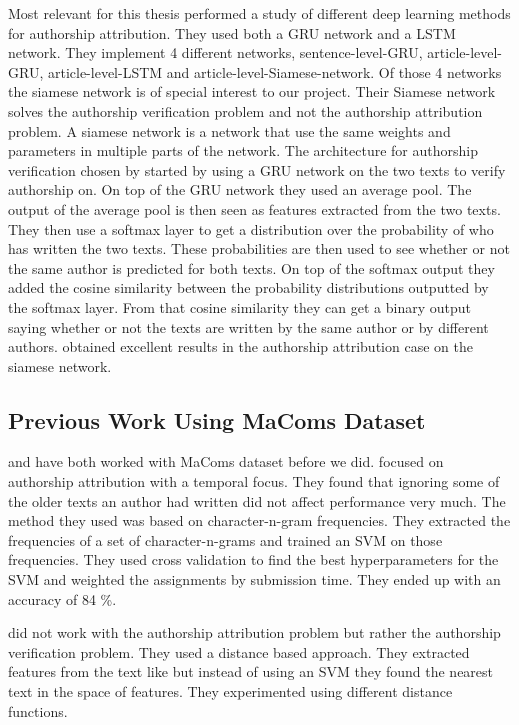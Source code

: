 Most relevant for this thesis \citet{qian:2018} performed a study of different
deep learning methods for authorship attribution. They used both a \gls{GRU}
network and a \gls{LSTM} network. They implement 4 different networks,
sentence-level-\gls{GRU}, article-level-\gls{GRU}, article-level-\gls{LSTM} and
article-level-Siamese-network. Of those 4 networks the siamese network is of
special interest to our project. Their Siamese network solves the authorship
verification problem and not the authorship attribution problem. A siamese
network is a network that use the same weights and parameters in multiple
parts of the network. The architecture for authorship verification chosen by
\citet{qian:2018} started by using a \gls{GRU} network on the two texts to
verify authorship on. On top of the \gls{GRU} network they used an average
pool. The output of the average pool is then seen as features extracted from
the two texts. They then use a softmax layer to get a distribution over the
probability of who has written the two texts. These probabilities are then used
to see whether or not the same author is predicted for both texts. On top of
the softmax output they added the cosine similarity between the probability
distributions outputted by the softmax layer. From that cosine similarity they
can get a binary output saying whether or not the texts are written by the same
author or by different authors. \citet{qian:2018} obtained excellent results in
the authorship attribution case on the siamese network.


\subsection{Previous Work Using MaComs Dataset}
\label{subsec:previous_work_using_macoms_dataset}

\citet{hansen2014} and \citet{aalykke2016} have both worked with MaComs dataset
before we did. \citet{hansen2014} focused on authorship attribution with a
temporal focus. They found that ignoring some of the older texts an author had
written did not affect performance very much. The method they used was based
on character-n-gram frequencies. They extracted the frequencies of a set of
character-n-grams and trained an \gls{SVM} on those frequencies. They used cross
validation to find the best hyperparameters for the \gls{SVM} and weighted the
assignments by submission time. They ended up with an accuracy of 84 \%.

\citet{aalykke2016} did not work with the authorship attribution problem but
rather the authorship verification problem. They used a distance based approach.
They extracted features from the text like \citet{hansen2014} but instead of
using an \gls{SVM} they found the nearest text in the space of features. They
experimented using different distance functions.

